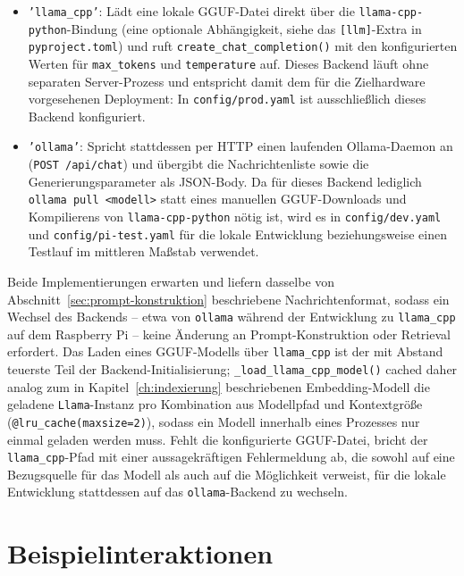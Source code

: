 \begin{itemize}
    \item \texttt{'llama\_cpp'}: Lädt eine lokale GGUF-Datei direkt über die
    \texttt{llama-cpp-python}-Bindung (eine optionale Abhängigkeit, siehe das
    \texttt{[llm]}-Extra in \texttt{pyproject.toml}) und ruft
    \texttt{create\_\allowbreak{}chat\_\allowbreak{}completion()} mit den konfigurierten Werten für
    \texttt{max\_tokens} und \texttt{temperature} auf. Dieses Backend läuft ohne
    separaten Server-Prozess und entspricht damit dem für die Zielhardware
    vorgesehenen Deployment: In \texttt{config/prod.yaml} ist ausschließlich dieses
    Backend konfiguriert.
    \item \texttt{'ollama'}: Spricht stattdessen per HTTP einen laufenden
    Ollama-Daemon an (\texttt{POST /api/chat}) und übergibt die Nachrichtenliste sowie
    die Generierungsparameter als JSON-Body. Da für dieses Backend lediglich
    \texttt{ollama pull <modell>} statt eines manuellen GGUF-Downloads und Kompilierens
    von \texttt{llama-cpp-python} nötig ist, wird es in \texttt{config/dev.yaml} und
    \texttt{config/\allowbreak{}pi-\allowbreak{}test.\allowbreak{}yaml} für die lokale Entwicklung beziehungsweise einen
    Testlauf im mittleren Maßstab verwendet.
\end{itemize}

Beide Implementierungen erwarten und liefern dasselbe von
Abschnitt~\ref{sec:prompt-konstruktion} beschriebene Nachrichtenformat, sodass ein
Wechsel des Backends -- etwa von \texttt{ollama} während der Entwicklung zu
\texttt{llama\_cpp} auf dem Raspberry Pi -- keine Änderung an Prompt-Konstruktion oder
Retrieval erfordert. Das Laden eines GGUF-Modells über \texttt{llama\_cpp} ist der mit
Abstand teuerste Teil der Backend-Initialisierung; \texttt{\_\allowbreak{}load\_\allowbreak{}llama\_\allowbreak{}cpp\_\allowbreak{}model()}
cached daher analog zum in Kapitel~\ref{ch:indexierung} beschriebenen Embedding-Modell
die geladene \texttt{Llama}-Instanz pro Kombination aus Modellpfad und Kontextgröße
(\texttt{@lru\_\allowbreak{}cache(maxsize=2)}), sodass ein Modell innerhalb eines Prozesses nur
einmal geladen werden muss. Fehlt die konfigurierte GGUF-Datei, bricht der
\texttt{llama\_cpp}-Pfad mit einer aussagekräftigen Fehlermeldung ab, die sowohl auf
eine Bezugsquelle für das Modell als auch auf die Möglichkeit verweist, für die lokale
Entwicklung stattdessen auf das \texttt{ollama}-Backend zu wechseln.


\section{Beispielinteraktionen}
\label{sec:beispielinteraktionen}

